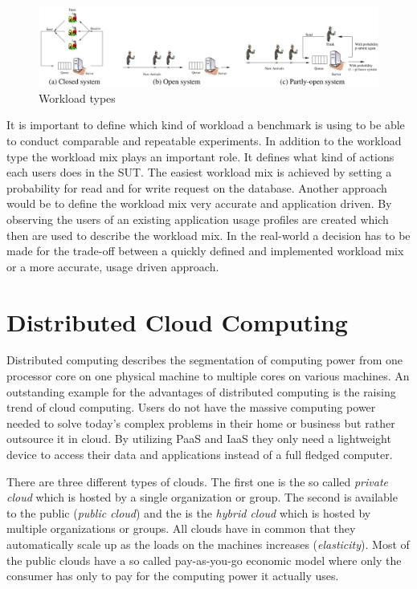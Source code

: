 \begin{figure}[h]
  \centering
  \includegraphics[width=\textwidth]{Figures/workload_types.png}
  \caption[Workload types]{Workload types}
  \label{fig:workload-types}
\end{figure}

It is important to define which kind of workload a benchmark is using to be able to conduct comparable and repeatable experiments. In addition to the workload type the workload mix plays an important role. It defines what kind of actions each users does in the \ac{SUT}. The easiest workload mix is achieved by setting a probability for read and for write request on the database. Another approach would be to define the workload mix very accurate and application driven. By observing the users of an existing application usage profiles are created which then are used to describe the workload mix. In the real-world a decision has to be made for the trade-off between a quickly defined and implemented workload mix or a more accurate, usage driven approach.

\section{Distributed Cloud Computing}
\label{sec:distributed-computing}
Distributed computing describes the segmentation of computing power from one processor core on one physical machine to multiple cores on various machines. An outstanding example for the advantages of distributed computing is the raising trend of cloud computing. Users do not have the massive computing power needed to solve today's complex problems in their home or business but rather outsource it in cloud. By utilizing \acf{PaaS} and \acf{IaaS} they only need a lightweight device to access their data and applications instead of a full fledged computer. \cite[1 - 2]{dikaiakos.2009}

There are three different types of clouds. The first one is the so called \emph{private cloud} which is hosted by a single organization or group. The second is available to the public (\emph{public cloud}) and the is the \emph{hybrid cloud} which is hosted by multiple organizations or groups. All clouds have in common that they automatically scale up as the loads on the machines increases (\emph{elasticity}). Most of the public clouds have a so called pay-as-you-go economic model where only the consumer has only to pay for the computing power it actually uses. \cite[2]{dikaiakos.2009}


